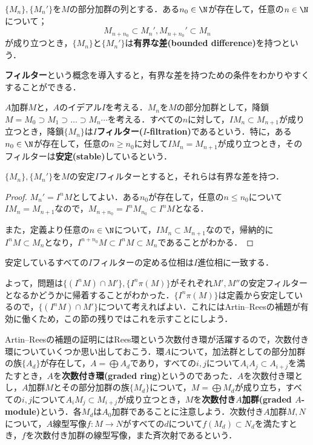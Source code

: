 \begin{defi}
	$\{M_n\},\{M_n'\}$を$M$の部分加群の列とする．ある$n_0\in\N$が存在して，任意の$n\in\N$について；
	\[M_{n+n_0}\subset M_n',M_{n+n_0}'\subset M_n\]
	が成り立つとき，$\{M_n\}$と$\{M_n'\}$は\textbf{有界な差(bounded difference)}を持つという．
\end{defi}

\textbf{フィルター}という概念を導入すると，有界な差を持つための条件をわかりやすくすることができる．

\begin{defi}[$I$フィルター]
	$A$加群$M$と，$A$のイデアル$I$を考える．$M_n$を$M$の部分加群として，降鎖$M=M_0\supset M_1\supset\dots\supset M_n\cdots$を考える．すべての$n$に対して，$IM_n\subset M_{n+1}$が成り立つとき，降鎖$\{M_n\}$は$I$\textbf{フィルター($I$-filtration)}であるという．特に，ある$n_0\in\N$が存在して，任意の$n\geq n_0$に対して$IM_n=M_{n+1}$が成り立つとき，そのフィルターは\textbf{安定(stable)}しているという．
\end{defi}

\begin{lem}\label{lem:安定しているフィルターは有界な差を持つ}
	$\{M_n\},\{M_n'\}$を$M$の安定$I$フィルターとすると，それらは有界な差を持つ．
\end{lem}

\begin{proof}
	$M_n'=I^nM$としてよい．ある$n_0$が存在して，任意の$n\leq n_0$について$IM_n=M_{n+1}$なので，$M_{n+n_0}=I^nM_{n_0}\subset I^nM$となる．
	
	また，定義より任意の$n\in\N$について，$IM_n\subset M_{n+1}$なので，帰納的に$I^nM\subset M_n$となり，$I^{n+n_0}M\subset I^nM\subset M_n$であることがわかる．
\end{proof}

\begin{cor}
	安定しているすべての$I$フィルターの定める位相は$I$進位相に一致する．
\end{cor}

よって，問題は$\{(I^nM)\cap M'\},\{I^n \pi(M)\}$がそれぞれ$M',M''$の安定フィルターとなるかどうかに帰着することがわかった．$\{I^n \pi(M)\}$は定義から安定しているので，$\{(I^nM)\cap M'\}$について考えればよい．これにはArtin--Reesの補題が有効に働くため，この節の残りではこれを示すことにしよう．

Artin--Reesの補題の証明にはRees環という次数付き環が活躍するので，次数付き環についていくつか思い出しておこう．環$A$について，加法群としての部分加群の族$\{A_d\}$が存在して，$A=\bigoplus A_d$であり，すべての$i,j$について$A_iA_j\subset A_{i+j}$を満たすとき，$A$を\textbf{次数付き環(graded ring)}というのであった．$A$を次数付き環とし，$A$加群$M$とその部分加群の族$\{M_d\}$について，$M=\bigoplus M_d$が成り立ち，すべての$i,j$について$A_iM_j\subset M_{i+j}$が成り立つとき，$M$を\textbf{次数付き}$A$\textbf{加群(graded $A$-module)}という．各$M_d$は$A_0$加群であることに注意しよう．次数付き$A$加群$M,N$について，$A$線型写像$f:M\to N$がすべての$d$について$f(M_d)\subset N_d$を満たすとき，$f$を次数付き加群の線型写像，また斉次射であるという．

